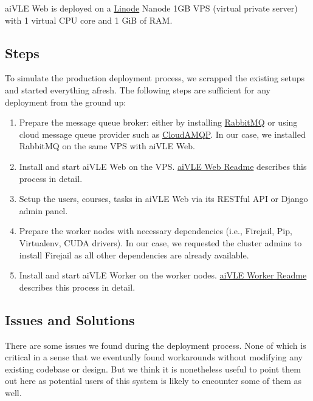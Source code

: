 aiVLE Web is deployed on a \href{https://linode.com/}{Linode} Nanode 1GB VPS (virtual private server) with 1 virtual CPU core and 1 GiB of RAM.

\subsection{Steps}

To simulate the production deployment process, we scrapped the existing setups and started everything afresh. The following steps are sufficient for any deployment from the ground up:

\begin{enumerate}
    \item Prepare the message queue broker: either by installing \href{https://www.rabbitmq.com/}{RabbitMQ} or using cloud message queue provider such as \href{https://www.cloudamqp.com/}{CloudAMQP}. In our case, we installed RabbitMQ on the same VPS with aiVLE Web.
    \item Install and start aiVLE Web on the VPS.  \href{https://github.com/edu-ai/aivle-web#readme}{aiVLE Web Readme} describes this process in detail.
    \item Setup the users, courses, tasks in aiVLE Web via its RESTful API or Django admin panel.
    \item Prepare the worker nodes with necessary dependencies (i.e., Firejail, Pip, Virtualenv, CUDA drivers). In our case, we requested the cluster admins to install Firejail as all other dependencies are already available.
    \item Install and start aiVLE Worker on the worker nodes. \href{https://github.com/edu-ai/aivle-worker#readme}{aiVLE Worker Readme} describes this process in detail.
\end{enumerate}

\subsection{Issues and Solutions}
There are some issues we found during the deployment process. None of which is critical in a sense that we eventually found workarounds without modifying any existing codebase or design. But we think it is nonetheless useful to point them out here as potential users of this system is likely to encounter some of them as well.
